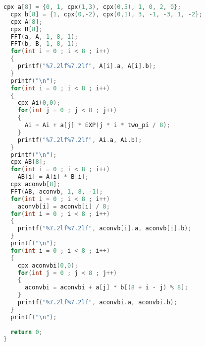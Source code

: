 \begin{lstlisting}[language=C++]
  cpx a[8] = {0, 1, cpx(1,3), cpx(0,5), 1, 0, 2, 0};
  cpx b[8] = {1, cpx(0,-2), cpx(0,1), 3, -1, -3, 1, -2};
  cpx A[8];
  cpx B[8];
  FFT(a, A, 1, 8, 1);
  FFT(b, B, 1, 8, 1);
  for(int i = 0 ; i < 8 ; i++)
  {
    printf("%7.2lf%7.2lf", A[i].a, A[i].b);
  }
  printf("\n");
  for(int i = 0 ; i < 8 ; i++)
  {
    cpx Ai(0,0);
    for(int j = 0 ; j < 8 ; j++)
    {
      Ai = Ai + a[j] * EXP(j * i * two_pi / 8);
    }
    printf("%7.2lf%7.2lf", Ai.a, Ai.b);
  }
  printf("\n");
  cpx AB[8];
  for(int i = 0 ; i < 8 ; i++)
    AB[i] = A[i] * B[i];
  cpx aconvb[8];
  FFT(AB, aconvb, 1, 8, -1);
  for(int i = 0 ; i < 8 ; i++)
    aconvb[i] = aconvb[i] / 8;
  for(int i = 0 ; i < 8 ; i++)
  {
    printf("%7.2lf%7.2lf", aconvb[i].a, aconvb[i].b);
  }
  printf("\n");
  for(int i = 0 ; i < 8 ; i++)
  {
    cpx aconvbi(0,0);
    for(int j = 0 ; j < 8 ; j++)
    {
      aconvbi = aconvbi + a[j] * b[(8 + i - j) % 8];
    }
    printf("%7.2lf%7.2lf", aconvbi.a, aconvbi.b);
  }
  printf("\n");
  
  return 0;
}
\end{lstlisting}
